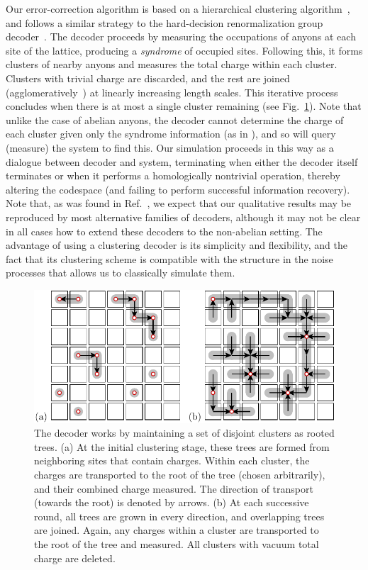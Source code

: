 \documentclass[aps, prl, letterpaper, twocolumn, superscriptaddress, notitlepage, 10pt]{revtex4-1}
\newcommand{\Fref}[1]{Fig.~\ref{#1}}
\begin{document}
Our error-correction algorithm is
based on a hierarchical clustering algorithm~\cite{Hastie2009, Wootton2015b},
and follows a similar strategy to the hard-decision renormalization group decoder~\cite{Bravyi2011}. 
The decoder proceeds by measuring the occupations of 
anyons at each site of the lattice, producing a \emph{syndrome} 
of occupied sites. Following this, it forms clusters of nearby anyons and 
measures the total charge within each cluster.
Clusters with trivial charge are discarded, and
the rest are joined (agglomeratively~\cite{Hastie2009})
at linearly increasing length scales. This iterative process concludes when 
there is at most a single cluster remaining (see \Fref{f:decode}).
Note that unlike the case of abelian anyons, the decoder
cannot determine the charge of each cluster given only the syndrome information (as in \cite{Bravyi2011}),
and so will query (measure) the system to find this.
Our simulation proceeds in this way as a dialogue between decoder
and system, terminating when either the decoder itself terminates or 
when it performs a homologically nontrivial operation, thereby altering the 
codespace (and failing to perform successful information recovery).
Note that, as was found in Ref.~\cite{Brell2013}, we expect that 
our qualitative results may be reproduced by most alternative families 
of decoders, although it may not be clear in all cases how to extend these decoders to the non-abelian setting.
The advantage of using a clustering decoder is 
its simplicity and flexibility, and the fact that its clustering 
scheme is compatible with the structure in the noise 
processes that allows us to classically simulate them.

\begin{figure}[t!]
\begin{center}
	\includegraphics[width=1.0\columnwidth]{pic-decode.pdf}
\caption{The decoder works by maintaining a set of disjoint clusters as rooted trees.
(a) At the initial clustering stage, these trees are formed 
from neighboring sites that contain charges. Within each cluster, the 
charges are transported to the root of the tree (chosen 
arbitrarily), and their combined charge measured. The direction of transport 
(towards the root) is denoted by arrows.
(b) At each successive round, all trees are grown in 
every direction, and overlapping trees are joined. Again, any charges 
within a cluster are transported to the root of the 
tree and measured. All clusters with vacuum total charge are deleted.
\label{f:decode}
}
\end{center}
\vspace{-10pt}
\end{figure}
\end{document}
